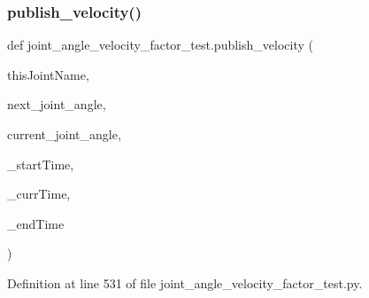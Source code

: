 \subsubsection{\texorpdfstring{publish\_velocity()}{publish\_velocity()}}
{\footnotesize\ttfamily def joint\+\_\+angle\+\_\+velocity\+\_\+factor\+\_\+test.\+publish\+\_\+velocity (\begin{DoxyParamCaption}\item[{}]{this\+Joint\+Name,  }\item[{}]{next\+\_\+joint\+\_\+angle,  }\item[{}]{current\+\_\+joint\+\_\+angle,  }\item[{}]{\+\_\+start\+Time,  }\item[{}]{\+\_\+curr\+Time,  }\item[{}]{\+\_\+end\+Time }\end{DoxyParamCaption})}



Definition at line 531 of file joint\+\_\+angle\+\_\+velocity\+\_\+factor\+\_\+test.\+py.


